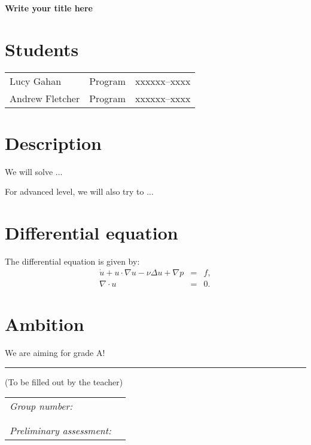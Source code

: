 \documentclass[11pt]{article}
\begin{document}
\begin{center}
	\Large \textbf{Write your title here}
\end{center}

\section*{Students}

\begin{tabular}{lll}
        Lucy Gahan     & Program & xxxxxx--xxxx \\
        Andrew Fletcher & Program & xxxxxx--xxxx \\
\end{tabular}

\section*{Description}

We will solve ...

For advanced level, we will also try to ...

\section*{Differential equation}

The differential equation is given by:
\begin{eqnarray*}
        \dot{u} + u \cdot \nabla u - \nu \Delta u + \nabla p &=& f, \\
        \nabla \cdot u &=& 0.
\end{eqnarray*}

\section*{Ambition}

We are aiming for grade A!

\vfill
\hspace{0.77cm}
\hrule
\scriptsize
(To be filled out by the teacher)

\small

\begin{tabular}{ll}
        \textit{Group number:}      & \underline{\quad\quad\quad\quad\quad} \\ \\ \\
        \textit{Preliminary assessment:} & \underline{\quad\quad\quad\quad\quad}
\end{tabular}
\end{document}

